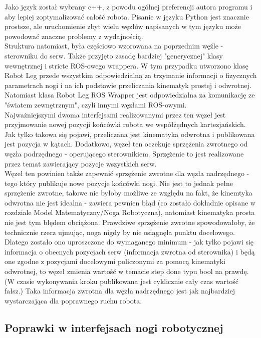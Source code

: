 Jako język został wybrany c++, z powodu ogólnej preferencji autora programu i aby lepiej zoptymalizować całość robota. Pisanie w języku Python jest znacznie prostsze, ale uruchomienie zbyt wielu węzłów napisanych w tym języku może powodować znaczne problemy z wydajnością.\\

Struktura natomiast, była częściowo wzorowana na poprzednim węźle - sterowniku do serw. Także przyjęto zasadę bardziej "generycznej" klasy wewnętrznej i stricte ROS-owego wrappera. W tym przypadku utworzono klasę Robot Leg przede wszystkim odpowiedzialną za trzymanie informacji o fizycznych parametrach nogi i na ich podstawie przeliczania kinematyk prostej i odwrotnej. Natomiast klasa Robot Leg ROS Wrapper jest odpowiedzialna za komunikację ze "światem zewnętrznym", czyli innymi węzłami ROS-owymi.\\

Najważniejszymi dwoma interfejsami realizowanymi przez ten węzeł jest przyjmowanie nowej pozycji końcówki robota we współżędnych kartezjańskich. Jak tylko takowa się pojawi, przeliczana jest kinematyka odwrotna i publikowana jest pozycja w kątach. Dodatkowo, węzeł ten oczekuje sprzężenia zwrotnego od węzła podrzędnego - operującego sterownikiem. Sprzężenie to jest realizowane przez temat zawierający pozycje wszystkich serw. \\

Węzeł ten powinien także zapewnić sprzężenie zwrotne dla węzła nadrzędnego - tego który publikuje nowe pozycje końcówki nogi. Nie jest to jednak pełne sprzężenie zwrotne, takowe nie byłoby możliwe ze względu na fakt, że kinemtyka odwrotna nie jest idealna - zawiera pewnien błąd (co zostało dokładnie opisane w rozdziale Model Matematyczny/Noga Robotyczna), natomiast kinematyka prosta nie jest tym błędem obciążona. Prawdziwe sprzężenie zwrotne spowodowałoby, że technicznie rzecz ujmując, noga nigdy by nie osiągnęła punktu docelowego. Dlatego zostało ono uproszczone do wymaganego minimum - jak tylko pojawi się informacja o obecnych pozycjach serw (informacja zwrotna od sterownika) i będą one zgodne z pozycjami docelowymi policzonymi za pomocą kinematyki odwrotnej, to węzeł zmienia wartość w temacie step done typu bool na prawdę. (W czasie wykonywania kroku publikowana jest cyklicznie cały czas wartość fałsz.) Taka informacja zwrotna dla węzła nadrzędnego jest jak najbardziej wystarczająca dla poprawnego ruchu robota.\\

\subsection{Poprawki w interfejsach nogi robotycznej}


